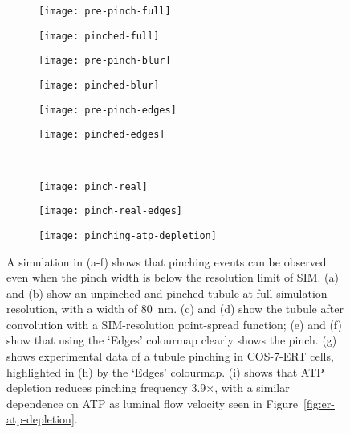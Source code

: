 \begin{figure}[tbp]
\centering
\begin{subfigure}[b]{0.16\textwidth}
	\texttt{[image: pre-pinch-full]}
	\caption{}\label{fig:pre-pinch-full}
\end{subfigure}\hfill
\begin{subfigure}[b]{0.16\textwidth}
	\texttt{[image: pinched-full]}
	\caption{}\label{fig:pinched-full}
\end{subfigure}\hfill
\begin{subfigure}[b]{0.16\textwidth}
	\texttt{[image: pre-pinch-blur]}
	\caption{}\label{fig:pre-pinch-blur}
\end{subfigure}\hfill
\begin{subfigure}[b]{0.16\textwidth}
	\texttt{[image: pinched-blur]}
	\caption{}\label{fig:pinched-blur}
\end{subfigure}\hfill
\begin{subfigure}[b]{0.16\textwidth}
	\texttt{[image: pre-pinch-edges]}
	\caption{}\label{fig:pinched-edges}
\end{subfigure}\hfill
\begin{subfigure}[b]{0.16\textwidth}
	\texttt{[image: pinched-edges]}
	\caption{}\label{fig:pre-pinch-edges}
\end{subfigure}

~\newline
\begin{subfigure}[b]{0.36\textwidth}
	\texttt{[image: pinch-real]}
	\caption{}\label{fig:pinched-real}
\end{subfigure}\hfill
\begin{subfigure}[b]{0.36\textwidth}
	\texttt{[image: pinch-real-edges]}
	\caption{}\label{fig:pre-real-edges}
\end{subfigure}\hfill
\begin{subfigure}[b]{0.265\textwidth}
	\texttt{[image: pinching-atp-depletion]}
	\caption{}\label{fig:pinching-atp-depletion}
\end{subfigure}
\caption[ER: Tubule pinching can be observed with the `Edges' colourmap]{A simulation in (a-f) shows that pinching events can be observed even when the pinch width is below the resolution limit of SIM. (a) and (b) show an unpinched and pinched tubule at full simulation resolution, with a width of \SI{80}{\nano\metre}. (c) and (d) show the tubule after convolution with a SIM-resolution point-spread function; (e) and (f) show that using the `Edges' colourmap clearly shows the pinch.  (g) shows experimental data of a tubule pinching in COS-7-ERT cells, highlighted in (h) by the `Edges' colourmap. (i) shows that ATP depletion reduces pinching frequency 3.9$\times$, with a similar dependence on ATP as luminal flow velocity seen in Figure~\ref{fig:er-atp-depletion}. } 
\label{fig:er-pinching}
\end{figure}


